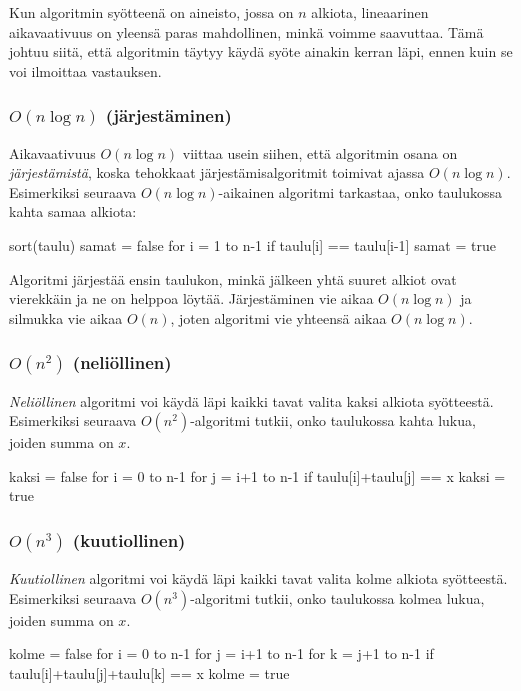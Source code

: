 Kun algoritmin syötteenä on aineisto, jossa on $n$ alkiota,
lineaarinen aikavaativuus on yleensä paras mahdollinen,
minkä voimme saavuttaa.
Tämä johtuu siitä, että algoritmin täytyy käydä syöte
ainakin kerran läpi, ennen kuin se voi ilmoittaa vastauksen.

\subsubsection{$O(n \log n)$ (järjestäminen)}

Aikavaativuus $O(n \log n)$ viittaa usein siihen,
että algoritmin osana on \emph{järjes\-tämistä},
koska tehokkaat järjestämisalgoritmit
toimivat ajassa $O(n \log n)$.
Esimerkiksi seuraava $O(n \log n)$-aikainen
algoritmi tarkastaa, onko taulukossa kahta samaa alkiota:

\begin{code}
sort(taulu)
samat = false
for i = 1 to n-1
    if taulu[i] == taulu[i-1]
        samat = true
\end{code}

Algoritmi järjestää ensin taulukon, minkä jälkeen yhtä
suuret alkiot ovat vierekkäin ja ne on helppoa löytää.
Järjestäminen vie aikaa $O(n \log n)$
ja silmukka vie aikaa $O(n)$, joten algoritmi vie
yhteensä aikaa $O(n \log n)$.

\subsubsection{$O(n^2)$ (neliöllinen)}

\emph{Neliöllinen} algoritmi voi käydä läpi kaikki tavat valita
kaksi alkiota syöt\-teestä.
Esimerkiksi seuraava $O(n^2)$-algoritmi tutkii, onko taulukossa
kahta lukua, joiden summa on $x$.

\begin{code}
kaksi = false
for i = 0 to n-1
    for j = i+1 to n-1
        if taulu[i]+taulu[j] == x
            kaksi = true
\end{code}

\subsubsection{$O(n^3)$ (kuutiollinen)}

\emph{Kuutiollinen} algoritmi voi käydä läpi kaikki tavat valita
kolme alkiota syöt\-teestä.
Esimerkiksi seuraava $O(n^3)$-algoritmi tutkii, onko taulukossa
kolmea lukua, joiden summa on $x$.

\begin{code}
kolme = false
for i = 0 to n-1
    for j = i+1 to n-1
        for k = j+1 to n-1
            if taulu[i]+taulu[j]+taulu[k] == x
                kolme = true
\end{code}


